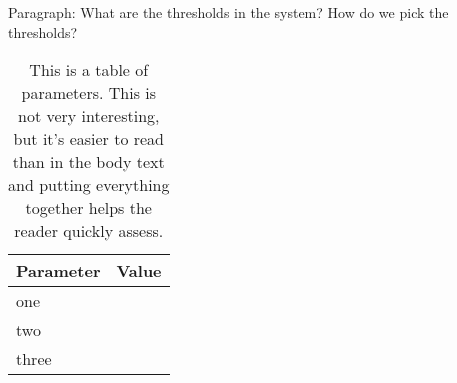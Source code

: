 Paragraph: What are the thresholds in the system? How do we pick the thresholds?

\begin{table}
\begin{tabular}{ll}
\toprule
Parameter & Value \\
\midrule
one & \\
two & \\
three & \\
\bottomrule
\end{tabular}
\caption{This is a table of parameters. This is not very interesting, but it's easier to read than in the body text and putting everything together helps the reader quickly assess.}
\end{table}